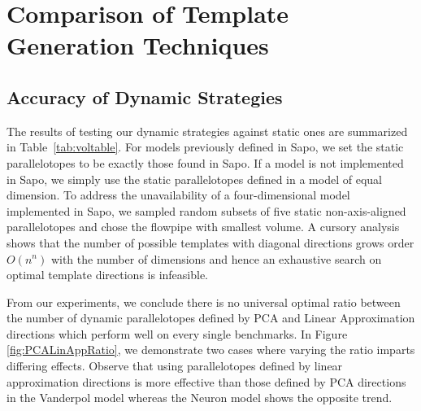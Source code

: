 



\section{Comparison of Template Generation Techniques}
\label{sec:compare}

\subsection{Accuracy of Dynamic Strategies}
\label{sec:dynamic_accuracy}
The results of testing our dynamic strategies against static ones are summarized in Table~\ref{tab:voltable}. For models previously defined in Sapo, we set the static parallelotopes to be exactly those found in Sapo.
If a model is not implemented in Sapo, we simply use the static parallelotopes defined in a model of equal dimension. To address the unavailability of a four-dimensional model implemented in Sapo, we sampled random subsets of five static non-axis-aligned parallelotopes and chose the flowpipe with smallest volume.
%
%
A cursory analysis shows that the number of possible templates with diagonal directions grows order $O(n^n)$ with the number of dimensions and hence an exhaustive search on optimal template directions is infeasible.


From our experiments, we conclude there is no universal optimal ratio between the number of dynamic parallelotopes defined by PCA and Linear Approximation directions which perform well on every single benchmarks. In Figure \ref{fig:PCALinAppRatio}, we demonstrate two cases where varying the ratio imparts differing effects. Observe that using parallelotopes defined by linear approximation directions is more effective than those defined by PCA directions in the Vanderpol model whereas the Neuron model shows the opposite trend.

